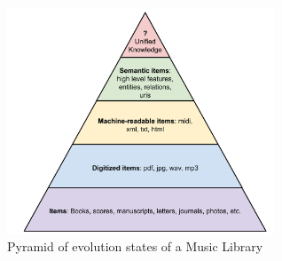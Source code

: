\begin{figure}[!ht]
	\centering
	\includegraphics[width=8cm]{ch05_musicology/pics/evolution-dl.jpg}
	\caption{Pyramid of evolution states of a Music Library
	\label{fig:musicology:pyramid}}
\end{figure}




